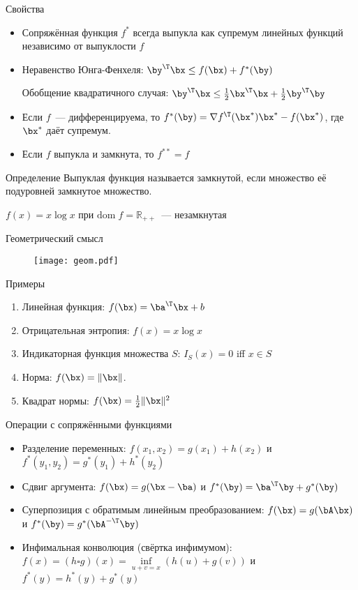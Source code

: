\documentclass[12pt]{beamer}
\begin{document}
\begin{frame}{Свойства}
\begin{itemize}
\item Сопряжённая функция $f^*$ всегда выпукла как супремум линейных функций независимо от выпуклости $f$
\item Неравенство Юнга-Фенхеля: $\by^{\T}\bx \leq f(\bx) + f^*(\by)$

Обобщение квадратичного случая: $\by^{\T}\bx \leq \frac{1}{2}\bx^{\T}\bx + \frac{1}{2}\by^{\T}\by$
\item Если $f$~--- дифференцируема, то $f^*(\by) = \nabla f^{\T}(\bx^*)\bx^* - f(\bx^*)$, где $\bx^*$ даёт супремум.
\item Если $f$ выпукла и замкнута, то $f^{**} = f$
\end{itemize}

\begin{block}{Определение}
Выпуклая функция называется замкнутой, если множество её подуровней замкнутое множество.

$f(x) = x\log x$ при $\mathrm{dom} \; f = \mathbb{R}_{++}$~--- незамкнутая
\end{block}

\end{frame}

\begin{frame}{Геометрический смысл}
\begin{figure}
\texttt{[image: geom.pdf]}
\end{figure}
\end{frame}

\begin{frame}{Примеры}
\begin{enumerate}
\item Линейная функция: $f(\bx) = \ba^{\T}\bx + b$
\item Отрицательная энтропия: $f(x) = x\log x$
\item Индикаторная функция множества $S$: $I_S(x) = 0$ iff $x \in S$
\item Норма: $f(\bx) = \|\bx\|$.
\item Квадрат нормы: $f(\bx) = \frac{1}{2}\|\bx\|^2$
\end{enumerate}
\end{frame}

\begin{frame}{Операции с сопряжёнными функциями}

\begin{itemize}
\item Разделение переменных: $f(x_1, x_2) = g(x_1) + h(x_2)$ и $f^*(y_1, y_2) = g^*(y_1) + h^*(y_2)$
\item Сдвиг аргумента: $f(\bx) = g(\bx - \ba)$ и $f^*(\by) = \ba^{\T}\by + g^*(\by)$
\item Суперпозиция с обратимым линейным преобразованием: $f(\bx) = g(\bA\bx)$ и $f^*(\by) = g^*(\bA^{-\T}\by)$
\item Инфимальная конволюция (свёртка инфимумом):  $f(x) = (h \square g)(x) = \inf\limits_{u + v = x} (h(u) + g(v))$ и $f^*(y) = h^*(y) + g^*(y)$
\end{itemize}

\end{frame}
\end{document}
